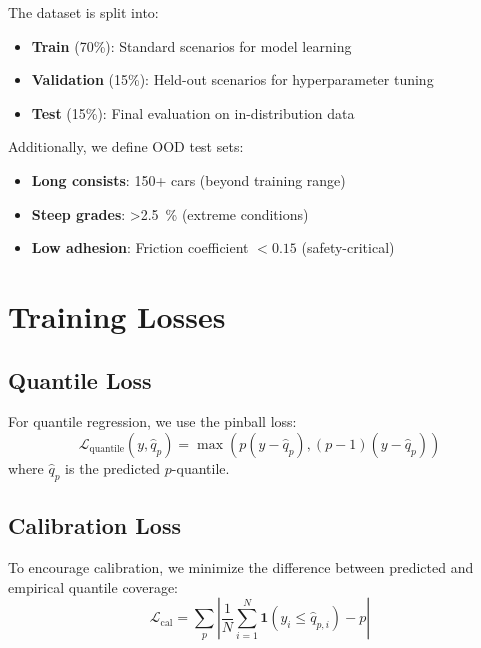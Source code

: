 The dataset is split into:
\begin{itemize}
    \item \textbf{Train} (70\%): Standard scenarios for model learning
    \item \textbf{Validation} (15\%): Held-out scenarios for hyperparameter tuning
    \item \textbf{Test} (15\%): Final evaluation on in-distribution data
\end{itemize}

Additionally, we define OOD test sets:
\begin{itemize}
    \item \textbf{Long consists}: 150+ cars (beyond training range)
    \item \textbf{Steep grades}: \SI{>2.5}{\percent} (extreme conditions)
    \item \textbf{Low adhesion}: Friction coefficient $< 0.15$ (safety-critical)
\end{itemize}


\section{Training Losses}

\subsection{Quantile Loss}

For quantile regression, we use the pinball loss:
\begin{equation}
    \mathcal{L}_{\text{quantile}}(y, \hat{q}_p) = \max(p(y - \hat{q}_p), (p-1)(y - \hat{q}_p))
    \label{eq:pinball_loss}
\end{equation}
where $\hat{q}_p$ is the predicted $p$-quantile.

\subsection{Calibration Loss}

To encourage calibration, we minimize the difference between predicted and empirical quantile coverage:
\begin{equation}
    \mathcal{L}_{\text{cal}} = \sum_p \left| \frac{1}{N} \sum_{i=1}^N \mathbf{1}(y_i \leq \hat{q}_{p,i}) - p \right|
    \label{eq:calibration_loss}
\end{equation}

